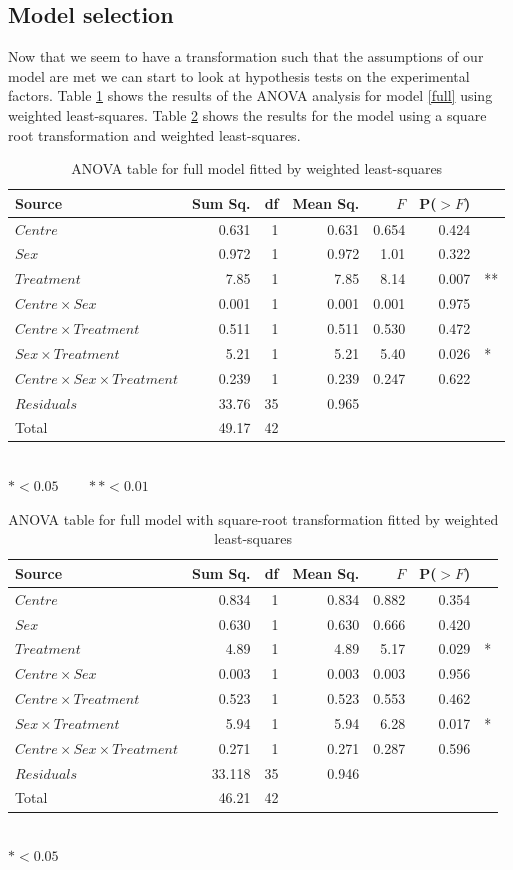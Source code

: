 \subsection{Model selection}
Now that we seem to have a transformation such that the assumptions of our model are met we can start to look at hypothesis tests on the experimental factors. Table \ref{aovwt} shows the results of the ANOVA analysis for model \ref{full} using  weighted least-squares. Table \ref{aovsqrtwt} shows the results for the model using a square root transformation and weighted least-squares.
\begin{table}[h]
\centering
\caption{ANOVA table for full model fitted by weighted least-squares}\label{aovwt}
\begin{tabular}{l|rrrrrl}
Source&Sum Sq.&df&Mean Sq.&$F$&P($>F$)\\
\hline
$Centre$     &                0.631  &1& 0.631 & 0.654 &0.424&\\
$Sex$        &              0.972  &1& 0.972 & 1.01 &0.322\\
$Treatment$  &            7.85  &1& 7.85  &8.14 &0.007 &**\\
$Centre\times Sex$ &             0.001 &1&  0.001 & 0.001 &0.975&\\
$Centre\times Treatment$ &        0.511  &1& 0.511 & 0.530 &0.472&\\
$Sex\times Treatment$     &     5.21  &1& 5.21 & 5.40 &0.026 &* \\
$Centre\times Sex\times Treatment$ &   0.239 &1&  0.239 & 0.247& 0.622&\\
$Residuals$      &    33.76 &35&  0.965  &&&\\
\hline
Total&49.17&42&&&
\end{tabular}\\
$*<0.05\quad\quad**<0.01$
\end{table}
\begin{table}[h]
\centering
\caption{ANOVA table for full model with square-root transformation fitted by weighted least-squares}\label{aovsqrtwt}
\begin{tabular}{l|rrrrrl}                   
Source&Sum Sq.&df&Mean Sq.&$F$&P($>F$)\\
\hline
$Centre$     &                0.834 &1&  0.834 & 0.882 & 0.354 &\\    
$Sex$        &               0.630 &1&  0.630 & 0.666 & 0.420 &\\  
$Treatment$  &            4.89 &1&  4.89 &  5.17 & 0.029& *\\
$Centre\times Sex$ &             0.003 &1& 0.003 & 0.003 & 0.956&\\
$Centre\times Treatment$ &        0.523 &1&  0.523 & 0.553 & 0.462&\\
$Sex\times Treatment$     &     5.94 &1& 5.94 & 6.28 & 0.017& *\\
$Centre\times Sex\times Treatment$ &   0.271 &1&  0.271 & 0.287 & 0.596&\\
$Residuals$      &    33.118 &35&  0.946 &&&\\
\hline
Total&46.21&42&&&
\end{tabular}\\
$*<0.05$
\end{table}

